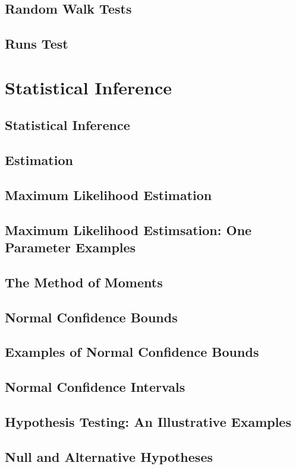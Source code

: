 \documentclass[11pt]{article}
\begin{document}
    \section{Random Walk Tests}
    \section{Runs Test}

    \chapter{Statistical Inference}
    \section{Statistical Inference}
    \section{Estimation}
    \section{Maximum Likelihood Estimation}
    \section{Maximum Likelihood Estimsation: One Parameter Examples}
    \section{The Method of Moments}
    \section{Normal Confidence Bounds}
    \section{Examples of Normal Confidence Bounds}
    \section{Normal Confidence Intervals}
    \section{Hypothesis Testing: An Illustrative Examples}
    \section{Null and Alternative Hypotheses}
\end{document}
